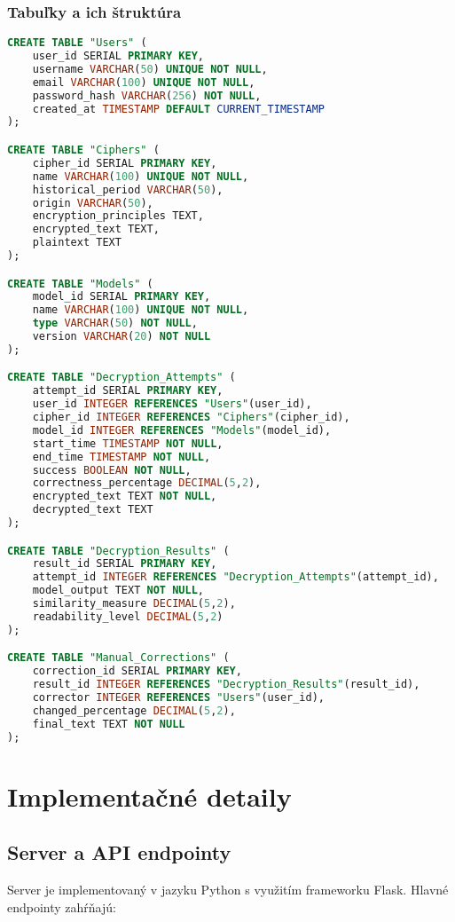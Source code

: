 \documentclass[12pt,a4paper]{article}
\begin{document}
\subsubsection{Tabuľky a ich štruktúra}
\begin{lstlisting}[language=SQL]
CREATE TABLE "Users" (
    user_id SERIAL PRIMARY KEY,
    username VARCHAR(50) UNIQUE NOT NULL,
    email VARCHAR(100) UNIQUE NOT NULL,
    password_hash VARCHAR(256) NOT NULL,
    created_at TIMESTAMP DEFAULT CURRENT_TIMESTAMP
);

CREATE TABLE "Ciphers" (
    cipher_id SERIAL PRIMARY KEY,
    name VARCHAR(100) UNIQUE NOT NULL,
    historical_period VARCHAR(50),
    origin VARCHAR(50),
    encryption_principles TEXT,
    encrypted_text TEXT,
    plaintext TEXT
);

CREATE TABLE "Models" (
    model_id SERIAL PRIMARY KEY,
    name VARCHAR(100) UNIQUE NOT NULL,
    type VARCHAR(50) NOT NULL,
    version VARCHAR(20) NOT NULL
);

CREATE TABLE "Decryption_Attempts" (
    attempt_id SERIAL PRIMARY KEY,
    user_id INTEGER REFERENCES "Users"(user_id),
    cipher_id INTEGER REFERENCES "Ciphers"(cipher_id),
    model_id INTEGER REFERENCES "Models"(model_id),
    start_time TIMESTAMP NOT NULL,
    end_time TIMESTAMP NOT NULL,
    success BOOLEAN NOT NULL,
    correctness_percentage DECIMAL(5,2),
    encrypted_text TEXT NOT NULL,
    decrypted_text TEXT
);

CREATE TABLE "Decryption_Results" (
    result_id SERIAL PRIMARY KEY,
    attempt_id INTEGER REFERENCES "Decryption_Attempts"(attempt_id),
    model_output TEXT NOT NULL,
    similarity_measure DECIMAL(5,2),
    readability_level DECIMAL(5,2)
);

CREATE TABLE "Manual_Corrections" (
    correction_id SERIAL PRIMARY KEY,
    result_id INTEGER REFERENCES "Decryption_Results"(result_id),
    corrector INTEGER REFERENCES "Users"(user_id),
    changed_percentage DECIMAL(5,2),
    final_text TEXT NOT NULL
);
\end{lstlisting}

\section{Implementačné detaily}
\subsection{Server a API endpointy}
Server je implementovaný v jazyku Python s využitím frameworku Flask. Hlavné endpointy zahŕňajú:
\end{document}
